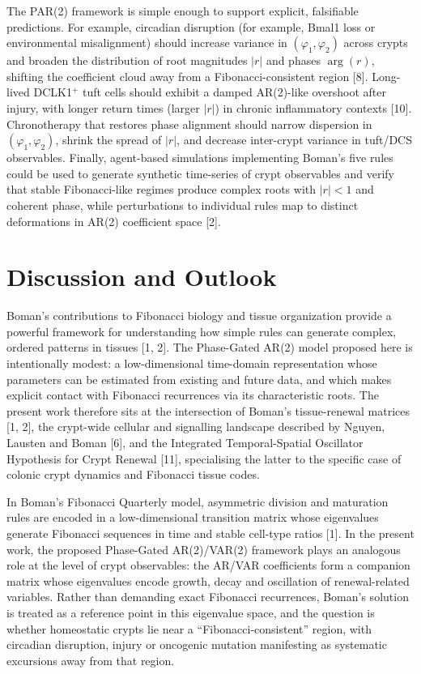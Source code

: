 \documentclass[]{interact}
\begin{document}
The PAR(2) framework is simple enough to support explicit, falsifiable
predictions.
For example, circadian disruption (for example, Bmal1 loss or environmental
misalignment) should increase variance in $(\varphi_1, \varphi_2)$ across
crypts and broaden the distribution of root magnitudes $|r|$ and phases
$\arg(r)$, shifting the coefficient cloud away from a Fibonacci-consistent
region [8].
Long-lived DCLK1$^{+}$ tuft cells should exhibit a damped AR(2)-like overshoot
after injury, with longer return times (larger $|r|$) in chronic inflammatory
contexts [10].
Chronotherapy that restores phase alignment should narrow dispersion in
$(\varphi_1, \varphi_2)$, shrink the spread of $|r|$, and decrease
inter-crypt variance in tuft/DCS observables.
Finally, agent-based simulations implementing Boman's five rules could be used
to generate synthetic time-series of crypt observables and verify that stable
Fibonacci-like regimes produce complex roots with $|r| < 1$ and coherent
phase, while perturbations to individual rules map to distinct deformations in
AR(2) coefficient space [2].

\section{Discussion and Outlook}

Boman's contributions to Fibonacci biology and tissue organization provide a
powerful framework for understanding how simple rules can generate complex,
ordered patterns in tissues [1, 2].
The Phase-Gated AR(2) model proposed here is intentionally modest: a
low-dimensional time-domain representation whose parameters can be estimated
from existing and future data, and which makes explicit contact with Fibonacci
recurrences via its characteristic roots.
The present work therefore sits at the intersection of Boman's tissue-renewal
matrices [1, 2], the crypt-wide cellular and signalling landscape described by
Nguyen, Lausten and Boman [6], and the Integrated Temporal-Spatial Oscillator
Hypothesis for Crypt Renewal [11], specialising the latter to the specific case
of colonic crypt dynamics and Fibonacci tissue codes.

In Boman's Fibonacci Quarterly model, asymmetric division and maturation rules
are encoded in a low-dimensional transition matrix whose eigenvalues generate
Fibonacci sequences in time and stable cell-type ratios [1].
In the present work, the proposed Phase-Gated AR(2)/VAR(2) framework plays an
analogous role at the level of crypt observables: the AR/VAR coefficients form
a companion matrix whose eigenvalues encode growth, decay and oscillation of
renewal-related variables.
Rather than demanding exact Fibonacci recurrences, Boman's solution is treated
as a reference point in this eigenvalue space, and the question is whether
homeostatic crypts lie near a ``Fibonacci-consistent'' region, with circadian
disruption, injury or oncogenic mutation manifesting as systematic excursions
away from that region.
\end{document}
